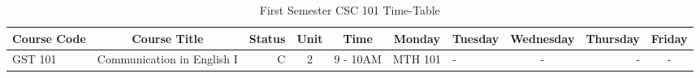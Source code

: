 \documentclass{article}
\begin{document}
	
	\begin{sidewaystable}[h!]
		\begin{center}
			\caption{First Semester CSC 101 Time-Table}
			\label{tab;table1}
			\begin{tabular}{l|c|r|c|c|c|l|c|r|c|}
				\textbf{Course Code} & \textbf{Course Title}
				 & \textbf{Status}  & \textbf{Unit}  & \textbf{Time}  & \textbf{Monday}  & \textbf{Tuesday}  & \textbf{Wednesday}  & \textbf{Thursday}  & \textbf{Friday}\\
				 \hline
			GST 101 & Communication in English I & C & 2 & 9 - 10AM & MTH 101 & - & - & - & - 
			\end{tabular}
		\end{center}
	\end{sidewaystable}
	
\end{document}
